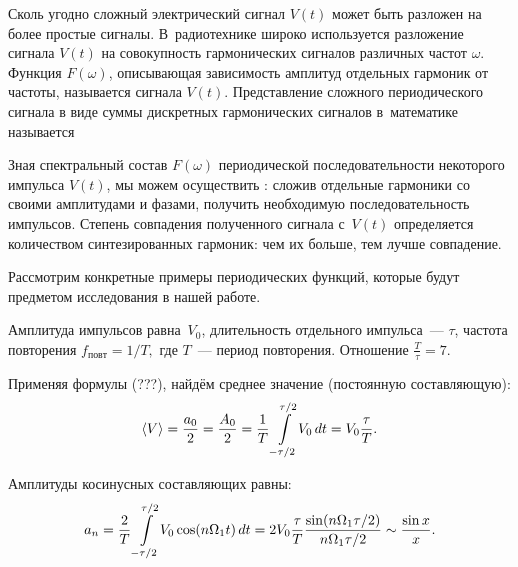 


Сколь угодно сложный электрический сигнал $V(t)$ может быть разложен на более простые сигналы. В~радиотехнике широко используется разложение сигнала $V(t)$ на совокупность гармонических сигналов различных частот $\omega$. Функция $F(\omega)$, описывающая зависимость амплитуд отдельных гармоник от частоты, называется  сигнала $V(t)$. Представление сложного периодического сигнала в виде суммы дискретных гармонических сигналов в~математике называется 

Зная спектральный состав $F(\omega)$ периодической последовательности некоторого импульса $V(t)$, мы можем осуществить : сложив отдельные гармоники со своими амплитудами и фазами, получить необходимую последовательность импульсов. Степень совпадения полученного сигнала с~$V(t)$ определяется количеством синтезированных гармоник: чем их больше, тем лучше совпадение.

Рассмотрим конкретные примеры периодических функций, которые будут предметом исследования в нашей работе.

Амплитуда импульсов равна~$V_0$, длительность отдельного импульса~--- $\tau$, частота повторения $f_{повт}=1/T,$ где $T$~--- период повторения. Отношение $\frac{T}{\tau}=7$.

Применяя формулы (???),
найдём среднее значение (постоянную составляющую):
\begin{equation}
	\langle V \rangle = \frac{a_0}{2} = \frac{A_0}{2} = \frac{1}{T}\int\limits_{-\tau/2}^{\tau/2} \!V_0\,dt = V_0 \frac{\tau}{T}.
	\eqmark{6.2.1}
\end{equation}

Амплитуды косинусных составляющих равны:
\begin{equation}
	a_n = \frac{2}{T} \int\limits_{-\tau/2}^{\tau/2} \!V_0\cos(n\Omega_1t)\,dt = 2V_0 \frac{\tau}{T} \frac{\sin(n\Omega_1\tau/2)}{n\Omega_1\tau/2} \sim \frac{\sin x}{x}.
	\eqmark{6.2.2}
\end{equation}


